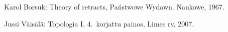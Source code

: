 \documentclass[12pt,a4paper,leqno]{report}
\theoremstyle{plain}
\theoremstyle{definition}
\theoremstyle{remark}
\begin{document}
\begin{thebibliography}{9}

Karol Borsuk: Theory of retracts, %
Państwowe Wydawn. Naukowe, 1967.

Jussi Väisälä: Topologia I, 4.\ korjattu painos, Limes ry, 2007.

%


\end{thebibliography}
\end{document}
